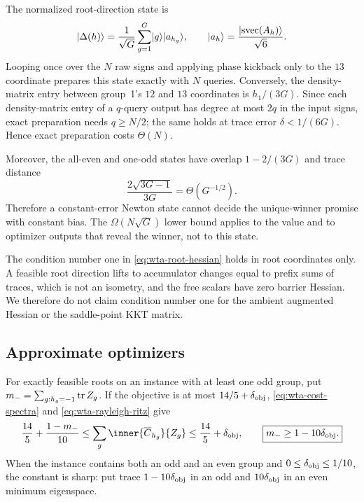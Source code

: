 \begin{remark}
\label{rem:wta-dilution}
The normalized root-direction state is
\begin{equation}
 \lvert \Delta(h)\rangle=\frac1{\sqrt G}\sum_{g=1}^G\lvert g\rangle\lvert a_{h_g}\rangle,
 \qquad
 \lvert a_h\rangle=\frac{\lvert \operatorname{svec}(A_h)\rangle}{\sqrt6}.
 \label{eq:wta-newton-state}
\end{equation}
Looping once over the $N$ raw signs and applying phase kickback only to the
$13$ coordinate prepares this state exactly with $N$ queries.  Conversely,
the density-matrix entry between group~1's $12$ and $13$ coordinates is
$h_1/(3G)$.  Since each density-matrix entry of a $q$-query
output has degree at most $2q$ in the input signs, exact preparation needs $q\ge N/2$; the same holds at trace error
$\delta<1/(6G)$.  Hence exact preparation costs $\Theta(N)$.

Moreover, the all-even and one-odd states have overlap $1-2/(3G)$ and trace
distance
\begin{equation}
 \frac{2\sqrt{3G-1}}{3G}=\Theta(G^{-1/2}).
 \label{eq:wta-newton-distance}
\end{equation}
Therefore a constant-error Newton state cannot decide the unique-winner
promise with constant bias.  The $\Omega(N\sqrt G)$ lower bound applies to
the value and to optimizer outputs that reveal the winner, not to this
state.
\end{remark}

The condition number one in \eqref{eq:wta-root-hessian} holds in root
coordinates only.  A feasible root direction lifts to accumulator changes
equal to prefix sums of traces, which is not an isometry, and the free
scalars have zero barrier Hessian.  We therefore do not claim condition
number one for the ambient augmented Hessian or the saddle-point KKT
matrix.

\subsection{Approximate optimizers}
\label{sec:wta-approximate-optimizers}

For exactly feasible roots on an instance with at least one odd group, put
$m_-=\sum_{g:h_g=-1}\operatorname{tr} Z_g$.  If the objective is at most
$14/5+\delta_{\rm obj}$, \eqref{eq:wta-cost-spectra} and
\eqref{eq:wta-rayleigh-ritz} give
\begin{equation}
 \frac{14}5+\frac{1-m_-}{10}\le \sum_g
 \inner{\overline C_{h_g}}{Z_g}
 \le\frac{14}5+\delta_{\rm obj},
 \qquad
 \boxed{m_-\ge1-10\delta_{\rm obj}.}
 \label{eq:wta-exact-optimizer-mass}
\end{equation}
When the instance contains both an odd and an even group and
$0\le\delta_{\rm obj}\le1/10$, the constant is sharp: put trace $1-10\delta_{\rm obj}$ in an odd
and $10\delta_{\rm obj}$ in an even minimum eigenspace.

